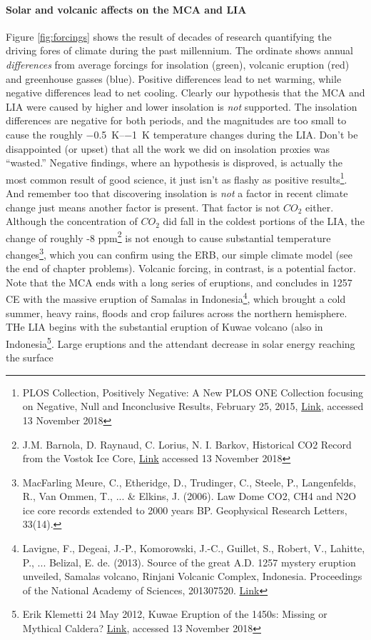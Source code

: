 \paragraph{Solar and volcanic affects on the MCA and LIA} 
Figure \ref{fig:forcings} shows the result of decades of research quantifying the driving fores of climate during the past millennium. The ordinate shows annual \emph{differences} from  average forcings for insolation (green), volcanic eruption (red) and greenhouse gasses (blue). Positive differences lead to net warming, while negative differences lead to net cooling. Clearly our hypothesis that the MCA and LIA were caused by higher and lower insolation is \emph{not} supported. The insolation differences are negative for both periods, and the magnitudes are too small to cause the roughly \SIrange{-0.5}{-1}{\kelvin} temperature changes during the LIA. Don't be disappointed (or upset) that all the work we did on insolation proxies was ``wasted.'' Negative findings, where an hypothesis is disproved, is actually the most common result of good science, it just isn't as flashy as positive results\footnote{PLOS Collection, Positively Negative: A New PLOS ONE Collection focusing on Negative, Null and Inconclusive Results, February 25, 2015,  \href{https://blogs.plos.org/everyone/2015/02/25/positively-negative-new-plos-one-collection-focusing-negative-null-inconclusive-results/}{Link}, accessed 13 November 2018}. And remember too that discovering insolation is \emph{not} a factor in recent climate change just means another factor is present. That factor is not $CO_2$ either. Although the concentration of $CO_2$ did fall in the coldest portions of the LIA, the change of roughly -8 ppm\footnote{J.M. Barnola, D. Raynaud, C. Lorius, N. I. Barkov, Historical CO2 Record from the Vostok Ice Core, \href{http://cdiac.ornl.gov/ftp/trends/co2/vostok.icecore.co2}{Link} accessed 13 November 2018} is not enough to cause substantial temperature changes\footnote{MacFarling Meure, C., Etheridge, D., Trudinger, C., Steele, P., Langenfelds, R., Van Ommen, T., ... \& Elkins, J. (2006). Law Dome CO2, CH4 and N2O ice core records extended to 2000 years BP. Geophysical Research Letters, 33(14).}, which you can confirm using the ERB, our simple climate model (see the end of chapter problems). Volcanic forcing, in contrast, is a potential factor. Note that the MCA ends with a long series of eruptions, and concludes in 1257 CE with the massive eruption of Samalas in Indonesia\footnote{Lavigne, F., Degeai, J.-P., Komorowski, J.-C., Guillet, S., Robert, V., Lahitte, P., ... Belizal, E. de. (2013). Source of the great A.D. 1257 mystery eruption unveiled, Samalas volcano, Rinjani Volcanic Complex, Indonesia. Proceedings of the National Academy of Sciences, 201307520. \href{https://doi.org/10.1073/pnas.1307520110}{Link}}, which brought a cold summer, heavy rains, floods and crop failures across the northern hemisphere. THe LIA begins with the substantial eruption of Kuwae volcano (also in Indonesia\footnote{Erik Klemetti 24 May 2012, Kuwae Eruption of the 1450s: Missing or Mythical Caldera? \href{https://www.wired.com/2012/05/kuwae-eruption-of-the-1450s-missing-or-mythical-caldera/}{Link}, accessed 13 November 2018}. Large eruptions and the attendant decrease in solar energy reaching the surface 